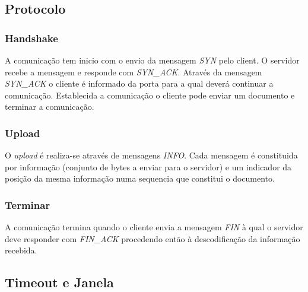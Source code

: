\documentclass{llncs}
\begin{document}
\subsection{Protocolo}
\subsubsection{Handshake}
A comunicação tem inicio com o envio da mensagem \textit{SYN} pelo client. O servidor recebe a mensagem e responde com \textit{SYN\_ACK}. Através da mensagem \textit{SYN\_ACK} o cliente é informado da porta para a qual deverá continuar a comunicação. Establecida a comunicação o cliente pode enviar um documento e terminar a comunicação.

\subsubsection{Upload}
O \textit{upload} é realiza-se através de mensagens \textit{INFO}. Cada mensagem é constituida por informação (conjunto de bytes a enviar para o servidor) e um indicador da posição da mesma informação numa sequencia que constitui o documento.

\subsubsection{Terminar}
A comunicação termina quando o cliente envia a mensagem \textit{FIN} à qual o servidor deve responder com \textit{FIN\_ACK} procedendo então à descodificação da informação recebida.

\subsection{Timeout e Janela}

\end{document}
